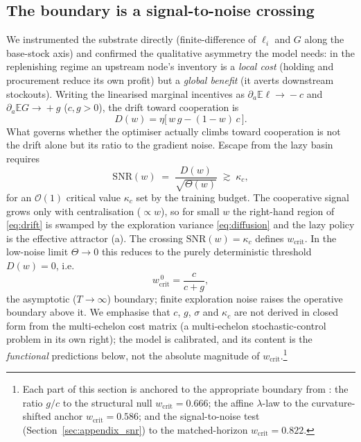 \documentclass[letterpaper]{article}
\theoremstyle{plain}
\newcommand{\wcrit}{w_{\mathrm{crit}}}
\begin{document}
\subsection{The boundary is a signal-to-noise crossing}
We instrumented the substrate directly (finite-difference of $\ell_i$ and
$G$ along the base-stock axis) and confirmed the qualitative asymmetry the
model needs: in the replenishing regime an upstream node's inventory is a
\emph{local cost} (holding and procurement reduce its own profit) but a
\emph{global benefit} (it averts downstream stockouts). Writing the
linearised marginal incentives as $\partial_a\mathbb{E}\ell\!\to\!-c$ and
$\partial_a\mathbb{E}G\!\to\!+g$ ($c,g>0$), the drift toward cooperation is
\begin{equation}
  D(w)=\eta\big[\,w\,g-(1-w)\,c\,\big].
  \label{eq:drift}
\end{equation}
What governs whether the optimiser actually climbs toward cooperation is
not the drift alone but its ratio to the gradient noise. Escape from the
lazy basin requires
\begin{equation}
  \mathrm{SNR}(w)\;=\;\frac{D(w)}{\sqrt{\Theta(w)}}\;\gtrsim\;\kappa_c ,
  \label{eq:snr}
\end{equation}
for an $\mathcal{O}(1)$ critical value $\kappa_c$ set by the training
budget. The cooperative signal grows only with centralisation
($\propto w$), so for small $w$ the right-hand region of \eqref{eq:drift}
is swamped by the exploration variance \eqref{eq:diffusion} and the lazy
policy is the effective attractor (a). The crossing
$\mathrm{SNR}(w)=\kappa_c$ defines $\wcrit$. In the low-noise limit
$\Theta\!\to\!0$ this reduces to the purely deterministic threshold
$D(w)=0$, i.e.
\begin{equation}
  \wcrit^{\,0}=\frac{c}{c+g},
  \label{eq:wcrit}
\end{equation}
the asymptotic ($T\!\to\!\infty$) boundary; finite exploration noise raises
the operative boundary above it. We emphasise that $c$, $g$, $\sigma$ and
$\kappa_c$ are not derived in closed form from the multi-echelon cost
matrix (a multi-echelon stochastic-control problem in its own right); the
model is calibrated, and its content is the \emph{functional} predictions
below, not the absolute magnitude of $\wcrit$.\footnote{%
  Each part of this section is anchored to the appropriate boundary from
  : the ratio $g/c$ to the structural null
  $\wcrit{=}0.666$; the affine $\lambda$-law to the curvature-shifted anchor
  $\wcrit{=}0.586$; and the signal-to-noise test
  (Section~\ref{sec:appendix_snr}) to the matched-horizon $\wcrit{=}0.822$.}
\end{document}
